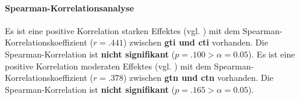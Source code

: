 \documentclass[a4paper,11pt]{article}%
\renewcommand{\\}{\vspace*{0.5\baselineskip} \newline}
\begin{document}
\paragraph{Spearman-Korrelationsanalyse}
Es ist eine positive Korrelation starken Effektes (vgl. \cite{cohen2013statistical}) mit dem Spearman-Korrelationskoeffizient ($r = .441$) zwischen \textbf{\ac{gti} und \ac{cti}} vorhanden. Die Spearman-Korrelation ist \textbf{nicht signifikant} ($p = .100 > \alpha = 0.05$).\\
Es ist eine positive Korrelation moderaten Effektes (vgl. \cite{cohen2013statistical}) mit dem Spearman-Korrelationskoeffizient ($r = .378$) zwischen \textbf{\ac{gtn} und \ac{ctn}} vorhanden. Die Spearman-Korrelation ist \textbf{nicht signifikant} ($p = .165 > \alpha = 0.05$).


\end{document}
